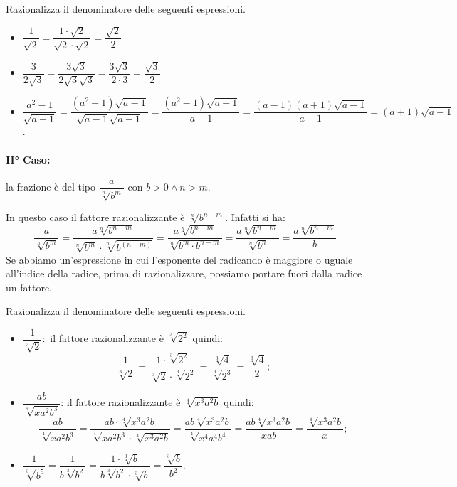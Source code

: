  \begin{esempio}
Razionalizza il denominatore delle seguenti espressioni.
\begin{itemize}
 \item $\dfrac 1{\sqrt 2}=\dfrac{1\cdot \sqrt 2}{\sqrt 2\cdot \sqrt 2}=
        \dfrac{\sqrt 2} 2$
 \item $\dfrac 3{2\sqrt 3}=\dfrac{3\sqrt 3}{2\sqrt 3\sqrt 3}=
        \dfrac{3\sqrt 3}{2\cdot 3}=\dfrac{\sqrt 3} 2$
 \item $\dfrac{a^2-1}{\sqrt{a-1}}=
        \dfrac{(a^2-1)\sqrt{a-1}}{\sqrt{a-1}\sqrt{a-1}}=
        \dfrac{(a^2-1)\sqrt{a-1}}{a-1}=
        \dfrac{(a-1)(a+1)\sqrt{a-1}}{a-1}=(a+1)\sqrt{a-1}$.
\end{itemize}
 \end{esempio}

\paragraph{II° Caso:}
 la frazione è del tipo $\dfrac a{\sqrt[n]{b^m}}$ con $b>0 \wedge n>m$.

In questo caso il fattore razionalizzante è $\sqrt[n]{b^{n-m}}$. Infatti si ha:
\begin{equation*}
\dfrac a{\sqrt[n]{b^m}}=
\dfrac{a\sqrt[n]{b^{n-m}}}{\sqrt[n]{b^m}\cdot \sqrt[n]{b^{(n-m)}}}=
\dfrac{a\sqrt[n]{b^{n-m}}}{\sqrt[n]{b^m\cdot b^{n-m}}}=
\dfrac{a\sqrt[n]{b^{n-m}}}{\sqrt[n]{b^n}}=\dfrac{a\sqrt[n]{b^{n-m}}} b
\end{equation*}
Se abbiamo un'espressione in cui l'esponente del radicando è maggiore o uguale 
all'indice della radice, prima di razionalizzare, possiamo portare fuori dalla 
radice un fattore.

 \begin{esempio}
Razionalizza il denominatore delle seguenti espressioni.
\begin{itemize}
 \item $\dfrac 1{\sqrt[3]2}$:\, il fattore razionalizzante è $\sqrt[3]{2^2}$ 
  quindi:
  \[\dfrac 1{\sqrt[3]2}=
  \dfrac{1\cdot \sqrt[3]{2^2}}{\sqrt[3]2\cdot \sqrt[3]{2^2}}=
  \dfrac{\sqrt[3]4}{\sqrt[3]{2^3}}=\dfrac{\sqrt[3]4} 2;\]
 \item $\dfrac{ab}{\sqrt[4]{xa^2b^3}}$:
 il fattore razionalizzante è $\sqrt[4]{x^3a^2b}$
 quindi: 
 \[\dfrac{ab}{\sqrt[4]{xa^2b^3}}=
 \dfrac{ab\cdot \sqrt[4]{x^3a^2b}}{\sqrt[4]{xa^2b^3}\cdot \sqrt[4]{x^3a^2b}}=
 \dfrac{ab\sqrt[4]{x^3a^2b}}{\sqrt[4]{x^4a^4b^4}}=
 \dfrac{ab\sqrt[4]{x^3a^2b}}{xab}=\dfrac{\sqrt[4]{x^3a^2b}} x;\]
 \item $\dfrac 1{\sqrt[3]{b^5}}=\dfrac 1{b\sqrt[3]{b^2}}=
        \dfrac{1\cdot \sqrt[3]b}{b\sqrt[3]{b^2}\cdot \sqrt[3]b}=
        \dfrac{\sqrt[3]b}{b^2}$.
\end{itemize}
 \end{esempio}


